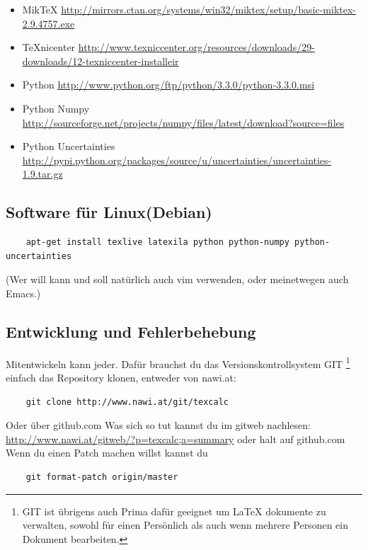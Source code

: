\documentclass[a4paper]{article}
\begin{document}
\begin{itemize}
	\item MikTeX \url{http://mirrors.ctan.org/systems/win32/miktex/setup/basic-miktex-2.9.4757.exe}
	\item TeXnicenter \url{http://www.texniccenter.org/resources/downloads/29-downloads/12-texniccenter-installeir}
	\item Python \url{http://www.python.org/ftp/python/3.3.0/python-3.3.0.msi}
	\item Python Numpy \url{http://sourceforge.net/projects/numpy/files/latest/download?source=files}
	\item Python Uncertainties \url{http://pypi.python.org/packages/source/u/uncertainties/uncertainties-1.9.tar.gz}
\end{itemize}

\subsection{Software für Linux(Debian)}

\begin{verbatim}
	apt-get install texlive latexila python python-numpy python-uncertainties
\end{verbatim}

(Wer will kann und soll natürlich auch vim verwenden, oder meinetwegen auch Emacs.)

\subsection{Entwicklung und Fehlerbehebung}

Mitentwickeln kann jeder. Dafür brauchst du das Versionskontrollsystem GIT
\footnote{GIT ist übrigens auch Prima dafür geeignet um LaTeX dokumente zu verwalten,
sowohl für einen Persönlich als auch wenn mehrere Personen ein Dokument bearbeiten. }
einfach das Repository klonen, entweder von nawi.at:

\begin{verbatim}
	git clone http://www.nawi.at/git/texcalc
\end{verbatim}

Oder über github.com Was sich so tut kannst du im gitweb nachlesen:
\url{http://www.nawi.at/gitweb/?p=texcalc;a=summary} oder halt auf github.com\\

Wenn du einen Patch machen willst kannst du

\begin{verbatim}
	git format-patch origin/master
\end{verbatim}
\end{document}
